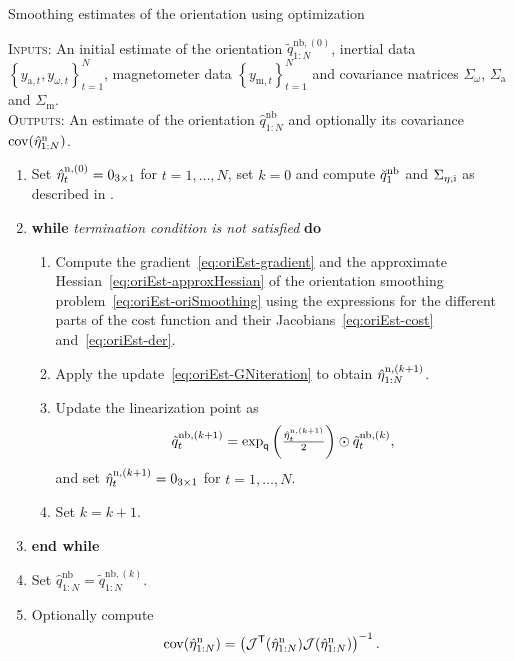 \begin{algorithm}[htp]
\caption{\textsf{Smoothing estimates of the orientation using optimization}}
\label{alg:oriEst-smoothingOpt}
\small
\textsc{Inputs:} An initial estimate of the orientation $\tilde{q}^{\text{nb},(0)}_{1:N}$, inertial data $\left\{ y_{\text{a},t}, y_{\omega,t} \right\}_{t=1}^N$, magnetometer data $\left\{ y_{\text{m},t}\right\}_{t=1}^N$ and covariance matrices $\Sigma_\omega$, $\Sigma_\text{a}$ and $\Sigma_\text{m}$. \\
\textsc{Outputs:} An estimate of the orientation $\hat{q}^\text{nb}_{1:N}$ and optionally its covariance $\operatorname{cov} (\hat{\eta}^\text{n}_{1:N})$.
\algrule[.4pt]
\begin{enumerate}
\item Set $\hat {\eta}_t^{\text{n},(0)} = 0_{3 \times 1}$ for $t = 1, \hdots, N$, set $k = 0$ and compute $\breve{q}_1^\text{nb}$ and $\Sigma_{\eta,\text{i}}$ as described in .
\item \textbf{while} \textit{termination condition is not satisfied} \textbf{do}
\begin{enumerate}
\item Compute the gradient~\eqref{eq:oriEst-gradient} and the approximate Hessian~\eqref{eq:oriEst-approxHessian} of the orientation smoothing problem~\eqref{eq:oriEst-oriSmoothing} using the expressions for the different parts of the cost function and their Jacobians~\eqref{eq:oriEst-cost} and~\eqref{eq:oriEst-der}.
\item Apply the update~\eqref{eq:oriEst-GNiteration} to obtain $\hat {\eta}_{1:N}^{\text{n},(k+1)}$.
\item Update the linearization point as
\begin{align}
\tilde q^{\text{nb},(k+1)}_t = \exp_\mathsf{q} \left( \tfrac{\hat{\eta}_t^{\text{n},(k+1)}}{2} \right) \odot \tilde{q}^{\text{nb},(k)}_t,
\label{eq:oriEst-relinSmoothing}
\end{align}
and set $\hat {\eta}_t^{\text{n},(k+1)} = 0_{3 \times 1}$ for $t = 1, \hdots, N$.
\item Set $k = k+1$.
\end{enumerate}
\item[] \textbf{end while}
\item Set $\hat{q}^\text{nb}_{1:N} = \tilde{q}^{\text{nb},(k)}_{1:N}$.
\item Optionally compute
\begin{align}
\operatorname{cov} (\hat{\eta}^\text{n}_{1:N}) = \left( \mathcal{J}^{\mathsf{T}}(\hat{\eta}^\text{n}_{1:N}) \mathcal{J} (\hat{\eta}^\text{n}_{1:N}) \right)^{-1}.
\end{align}
\end{enumerate}
\normalsize
\end{algorithm}

